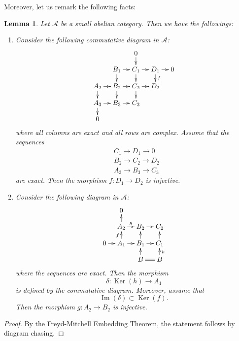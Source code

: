 \documentclass{article}
\newtheorem{lem}[thm]{\indent \sc Lemma}
\begin{document}
Moreover,
let us remark the following facts:
%
\begin{lem}\upshape\label{DGC}
Let $\mathcal{A}$ be a small abelian category. Then we have the followings:
%
\begin{enumerate}
%
\item
Consider the following commutative diagram in $\mathcal{A}$:
%
\begin{equation*}
\xymatrix@=10pt{
&&0\ar[d]&& \\
& B_{1}\ar[r]\ar[d]& C_{1}\ar[r]\ar[d]
&D_{1}\ar[r]\ar[d]^{f}&0
\\
A_{2}\ar[r]\ar[d]& B_{2}\ar[r]\ar[d] & C_{2}\ar[r]\ar[d] & D_{2} \\
A_{3}\ar[r]\ar[d]& B_{3}\ar[r]%
& C_{3}  \\
0& %
}
\end{equation*}
%
where all columns are exact and all rows are complex. Assume that the sequences
%
\begin{align*}
&C_{1}\to D_{1}\to 0   \\
&B_{2}\to C_{2}\to D_{2} \\
&A_{3}\to B_{3}\to C_{3}
\end{align*}
%
are exact. Then the morphism $f: D_{1}\to D_{2}$ is injective.
%
\item Consider the following diagram in $\mathcal{A}$:
%
\begin{equation*}
\xymatrix@=10pt{
&0 \\
&A_{2}\ar[u]\ar[r]^{g}
&B_{2}\ar[r]
&C_{2} \\
0\ar[r]
&A_{1}\ar[r]\ar[u]^{f}
&B_{1}\ar[r]\ar[u]
&C_{1}\ar[u]  \\
&
&B\ar[u]\ar@{=}[r]
&B\ar[u]_{h}
}    
\end{equation*}
%
where the sequences are exact. Then the morphism
%
\begin{equation*}
\delta: \operatorname{Ker}(h)
\to A_{1}
\end{equation*}
%
is defined by the commutative diagram.
%
Moreover, assume that 
%
\begin{equation*}
\operatorname{Im}(\delta)
\subset
\operatorname{Ker}(f).
\end{equation*}
%
Then the morphism $g: A_{2}\to B_{2}$ is injective.
%
\end{enumerate}
%
\end{lem}
%

%
\begin{proof}\upshape
By the Freyd-Mitchell Embedding Theorem, the statement follows by diagram chasing.
\end{proof}
%
\end{document}
